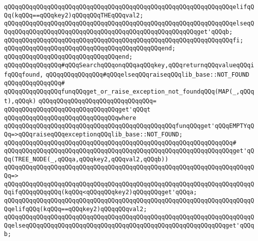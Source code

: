 \verb|qQQqqQQqqQQqqQQqqQQqqQQqqQQqqQQqqQQqqQQqqQQqqQQqqQQqqQQqqQQqqQQqelifqQQq(kqQQq==qQQqkey2)qQQqqQQqTHEqQQqval2;|\newline
\verb|qQQqqQQqqQQqqQQqqQQqqQQqqQQqqQQqqQQqqQQqqQQqqQQqqQQqqQQqqQQqqQQqelseqQQqqQQqqQQqqQQqqQQqqQQqqQQqqQQqqQQqqQQqqQQqqQQqqQQqqQQqget'qQQqb;|\newline
\verb|qQQqqQQqqQQqqQQqqQQqqQQqqQQqqQQqqQQqqQQqqQQqqQQqqQQqqQQqqQQqqQQqfi;|\newline
\verb|qQQqqQQqqQQqqQQqqQQqqQQqqQQqqQQqqQQqqQQqqQQqend;|\newline
\verb|qQQqqQQqqQQqqQQqqQQqqQQqqQQqqQQqend;|\newline
\newline
\verb|qQQqqQQqqQQqqQQq#qQQqSearchqQQqonqQQqaqQQqkey,qQQqreturnqQQqvalueqQQqifqQQqfound,|\newline
\verb|qQQqqQQqqQQqqQQq#qQQqelseqQQqraiseqQQqlib_base::NOT_FOUND|\newline
\verb|qQQqqQQqqQQqqQQq#|\newline
\verb|qQQqqQQqqQQqqQQqfunqQQqget_or_raise_exception_not_foundqQQq(MAP(_,qQQqt),qQQqk)|\newline
\verb|qQQqqQQqqQQqqQQqqQQqqQQqqQQqqQQq=|\newline
\verb|qQQqqQQqqQQqqQQqqQQqqQQqqQQqqQQqget'qQQqt|\newline
\verb|qQQqqQQqqQQqqQQqqQQqqQQqqQQqqQQqwhere|\newline
\verb|qQQqqQQqqQQqqQQqqQQqqQQqqQQqqQQqqQQqqQQqqQQqqQQqfunqQQqget'qQQqEMPTYqQQq=>qQQqraiseqQQqexceptionqQQqlib_base::NOT_FOUND;|\newline
\verb|qQQqqQQqqQQqqQQqqQQqqQQqqQQqqQQqqQQqqQQqqQQqqQQqqQQqqQQqqQQqqQQq#|\newline
\verb|qQQqqQQqqQQqqQQqqQQqqQQqqQQqqQQqqQQqqQQqqQQqqQQqqQQqqQQqqQQqqQQqget'qQQq(TREE_NODE(_,qQQqa,qQQqkey2,qQQqval2,qQQqb))|\newline
\verb|qQQqqQQqqQQqqQQqqQQqqQQqqQQqqQQqqQQqqQQqqQQqqQQqqQQqqQQqqQQqqQQqqQQqqQQq=>|\newline
\verb|qQQqqQQqqQQqqQQqqQQqqQQqqQQqqQQqqQQqqQQqqQQqqQQqqQQqqQQqqQQqqQQqqQQqqQQqifqQQqqQQqqQQq(kqQQq<qQQqqQQqkey2)qQQqqQQqget'qQQqa;|\newline
\verb|qQQqqQQqqQQqqQQqqQQqqQQqqQQqqQQqqQQqqQQqqQQqqQQqqQQqqQQqqQQqqQQqqQQqqQQqelifqQQq(kqQQq==qQQqkey2)qQQqqQQqval2;|\newline
\verb|qQQqqQQqqQQqqQQqqQQqqQQqqQQqqQQqqQQqqQQqqQQqqQQqqQQqqQQqqQQqqQQqqQQqqQQqelseqQQqqQQqqQQqqQQqqQQqqQQqqQQqqQQqqQQqqQQqqQQqqQQqqQQqqQQqget'qQQqb;|\newline
